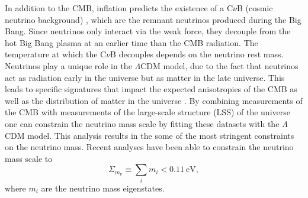 
In addition to the CMB, inflation predicts the existence of a C$\nu$B (cosmic neutrino background) \cite{numass_cosmo}, which are the remnant neutrinos produced during the Big Bang. Since neutrinos only interact via the weak force, they decouple from the hot Big Bang plasma at an earlier time than the CMB radiation. The temperature at which the C$\nu$B decouples depends on the neutrino rest mass. Neutrinos play a unique role in the $\Lambda$CDM model, due to the fact that neutrinos act as radiation early in the universe but as matter in the late universe. This leads to specific signatures that impact the expected anisotropies of the CMB as well as the distribution of matter in the universe \cite{planck2015}. By combining measurements of the CMB with measurements of the large-scale structure (LSS) of the universe one can constrain the neutrino mass scale by fitting these datasets with the $\Lambda$CDM model. This analysis results in the some of the most stringent constraints on the neutrino mass. Recent analyses \cite{Workman:2022ynf} have been able to constrain the neutrino mass scale to
\begin{equation}
     \Sigma_{m_\nu} \equiv \sum_{i}m_i<0.11~\mathrm{eV},
\end{equation}
where $m_i$ are the neutrino mass eigenstates. 


